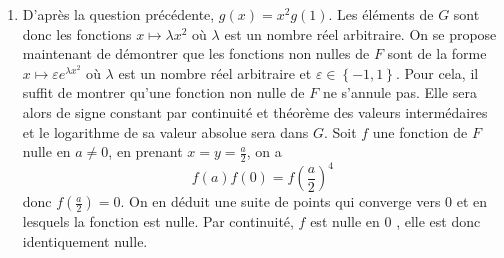 \begin{enumerate}
\item  D'apr{\`e}s la question pr{\'e}c{\'e}dente, $g(x)=x^{2}g(1)$. Les
{\'e}l{\'e}ments de $G$ sont donc les fonctions $x\mapsto \lambda x^{2}$
o{\`u} $\lambda $ est un nombre r{\'e}el arbitraire.\newline
On se propose maintenant de d{\'e}montrer que les fonctions non nulles de $F$ sont
de la forme $x\mapsto \varepsilon e^{\lambda x^{2}}$ o{\`u} $\lambda $
est un nombre r{\'e}el arbitraire et $\varepsilon \in \left\{ -1,1\right\} $.
Pour cela, il suffit de montrer qu'une fonction non nulle de $F$
ne s'annule pas. Elle sera alors de signe constant par continuit{\'e}
et th{\'e}or{\`e}me des valeurs interm{\'e}daires et le logarithme de sa
valeur absolue sera dans $G$.\newline
Soit $f$ une fonction de $F$ nulle en $a\neq 0$, en prenant $x=y=\frac{a}{2}$, on a
\begin{displaymath}
f(a)f(0)=f(\frac{a}{2})^{4}
\end{displaymath}
donc $f(\frac{a}{2})=0$. On en d{\'e}duit une suite de points qui converge
vers 0 et en lesquels la fonction est nulle. Par continuit{\'e}, $f$
est nulle en $0$ , elle est donc identiquement nulle.
\end{enumerate}

